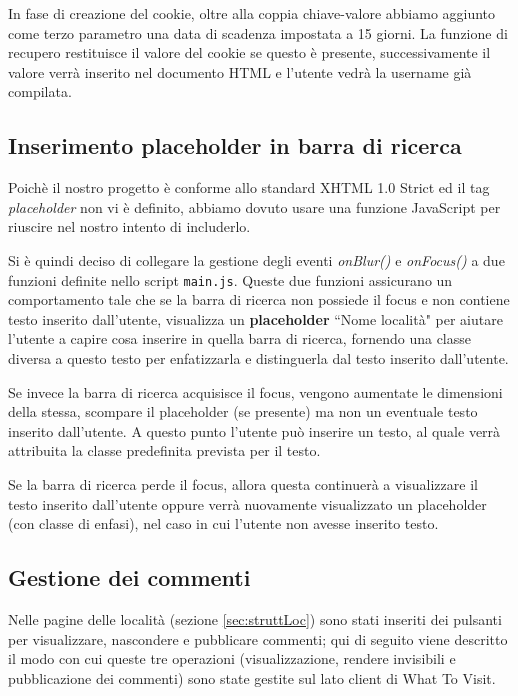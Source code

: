 In fase di creazione del cookie, oltre alla coppia chiave-valore abbiamo
aggiunto come terzo parametro una data di scadenza impostata a 15 giorni.
La funzione di recupero restituisce il valore del cookie se questo è presente,
successivamente il valore verrà inserito nel documento HTML e l'utente vedrà
la username già compilata.

\subsection{Inserimento placeholder in barra di ricerca}

Poichè il nostro progetto è conforme allo standard XHTML 1.0 Strict ed  il tag
\textit{placeholder} non vi è definito, abbiamo dovuto usare una funzione
JavaScript per riuscire nel nostro intento di includerlo.


Si è quindi deciso di collegare la gestione degli eventi \textit{onBlur()} e
\textit{onFocus()} a due funzioni definite nello script \texttt{main.js}.
Queste due funzioni assicurano un comportamento tale che se la barra di ricerca
non possiede il focus e non contiene testo inserito dall'utente, visualizza un
\textbf{placeholder} ``Nome località" per aiutare l'utente a capire cosa
inserire in quella barra di ricerca, fornendo una classe diversa a questo
testo per enfatizzarla e distinguerla dal testo inserito dall'utente.

Se invece la barra di ricerca acquisisce il focus, vengono aumentate le
dimensioni della stessa, scompare il placeholder (se presente) ma non un
eventuale testo inserito dall'utente. A questo punto l'utente può inserire un
testo, al quale verrà attribuita la classe predefinita prevista per il testo.

Se la barra di ricerca perde il focus, allora questa continuerà a visualizzare
il testo inserito dall'utente oppure verrà nuovamente visualizzato un placeholder (con classe di enfasi), nel caso in cui l'utente non avesse inserito testo.


\subsection{Gestione dei commenti}
Nelle pagine delle località (sezione \ref{sec:struttLoc}) sono stati
inseriti dei pulsanti per visualizzare, nascondere e pubblicare commenti; qui
di seguito viene descritto il modo con cui queste tre operazioni
(visualizzazione, rendere invisibili e pubblicazione dei commenti) sono state
gestite sul lato client di What To Visit.

